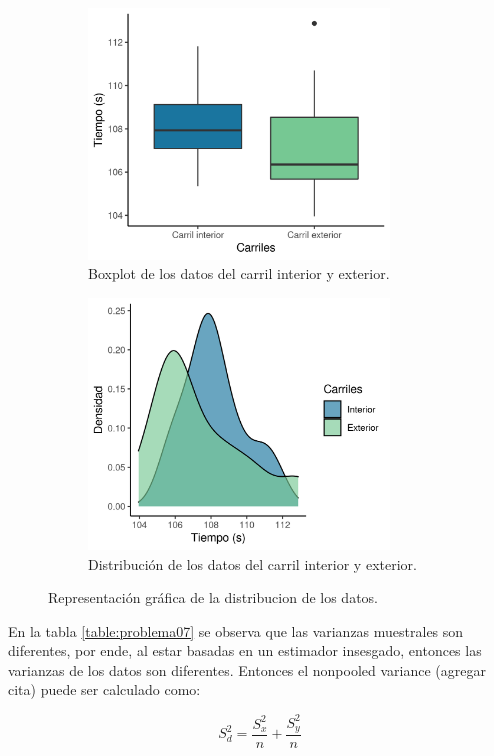 \begin{figure}[H]
	\centering
	\begin{subfigure}[b]{8cm}
		\includegraphics[width=8cm]{Graphics/problema07_boxplot.png}
		\caption{Boxplot de los datos del carril interior y exterior.}
		\label{fig:problema07_boxplot}
	\end{subfigure}
	\begin{subfigure}[b]{8cm}
		\includegraphics[width=8cm]{Graphics/problema07_histogram_2.png}
		\caption{Distribución de los datos del carril interior y exterior.}
		\label{fig:problema07_distribucion_datos}
	\end{subfigure}
	\caption{Representación gráfica de la distribucion de los datos.}
\end{figure}

En la tabla \ref{table:problema07} se observa que las varianzas muestrales son diferentes, por ende, al estar basadas en un estimador insesgado, entonces las varianzas de los datos son diferentes. Entonces el nonpooled variance (agregar cita) puede ser calculado como:

\begin{equation*}
	S_d^2 = \frac{S_x^2}{n} + \frac{S_y^2}{n}
\end{equation*}

